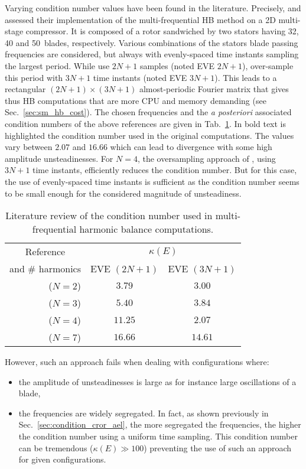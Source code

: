 Varying condition number values have been found in the literature.
Precisely, \citet{Gopinath2007} and
\citet{Ekici2007} assessed their implementation of the
multi-frequential HB method on a 2D multi-stage compressor. 
It is composed of a rotor sandwiched by two stators having
32, 40 and 50~blades, respectively. Various combinations of the stators
blade passing frequencies are considered, 
but always with evenly-spaced time instants sampling the
largest period.  While \citet{Gopinath2007} use $2N+1$ samples (noted EVE $2N+1$),
\citet{Ekici2007} over-sample this period with $3N+1$ time instants
(noted EVE $3N+1$). This
leads to a rectangular $(2N+1)\times(3N+1)$ almost-periodic Fourier
matrix that gives thus HB computations that are more CPU and memory demanding
(see Sec.~\ref{sec:sm_hb_cost}). 
The chosen frequencies and the \emph{a posteriori}
associated condition numbers of the above references are given in
Tab.~\ref{tab:literature_multistage}.  
In bold text is highlighted the condition number used in the
original computations. The values vary between $2.07$
and $16.66$ which can lead to divergence with some
high amplitude unsteadinesses.
For $N=4$, the
oversampling approach of \citet{Ekici2007}, using $3N+1$ 
time instants, efficiently reduces the
condition number. But for this case, the use of evenly-spaced time
instants is sufficient as the condition number seems to be small enough
for the considered magnitude of unsteadiness.
\begin{table}[htp]
   \centering
  \begin{tabular}{rcc}
    \toprule
    \multicolumn{1}{c}{Reference} & \multicolumn{2}{c}{$\kappa(E)$} \\
    \multicolumn{1}{c}{and \# harmonics} & EVE $(2N+1)$ & EVE $(3N+1)$ \\
    \midrule
    \citet{Gopinath2007} ($N=2$) & $\mathbf{3.79}$ & $3.00$ \\
    \citet{Ekici2007} ($N=3$) & $5.40$ & $\mathbf{3.84}$ \\
    \citet{Gopinath2007} ($N=4$) & $\mathbf{11.25}$ & $2.07$ \\
    \citet{Gopinath2007} ($N=7$) & $\mathbf{16.66}$ & $14.61$ \\
    \bottomrule
  \end{tabular}
  \caption{Literature review of the condition number used in multi-frequential
  harmonic balance computations.}
  \label{tab:literature_multistage}
\end{table}
However, such an approach fails when dealing with configurations where:
\begin{itemize} \itemsep0pt \parskip0pt
  \item the amplitude of unsteadinesses is large as for instance
  large oscillations of a blade,
  \item the frequencies are widely segregated. In fact, as shown previously
  in Sec.~\ref{sec:condition_cror_ael}, the more segregated the frequencies, the
  higher the condition number using a uniform time sampling. This condition number
  can be tremendous ($\kappa (E) \gg 100$) preventing the use of such
  an approach for given configurations.
\end{itemize}

